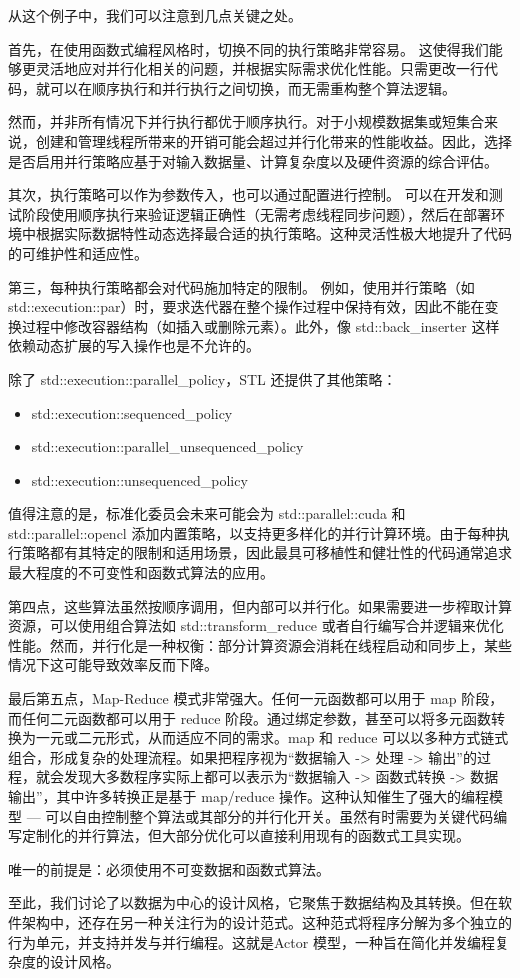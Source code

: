 从这个例子中，我们可以注意到几点关键之处。

首先，在使用函数式编程风格时，切换不同的执行策略非常容易。 这使得我们能够更灵活地应对并行化相关的问题，并根据实际需求优化性能。只需更改一行代码，就可以在顺序执行和并行执行之间切换，而无需重构整个算法逻辑。

然而，并非所有情况下并行执行都优于顺序执行。对于小规模数据集或短集合来说，创建和管理线程所带来的开销可能会超过并行化带来的性能收益。因此，选择是否启用并行策略应基于对输入数据量、计算复杂度以及硬件资源的综合评估。

其次，执行策略可以作为参数传入，也可以通过配置进行控制。 可以在开发和测试阶段使用顺序执行来验证逻辑正确性（无需考虑线程同步问题），然后在部署环境中根据实际数据特性动态选择最合适的执行策略。这种灵活性极大地提升了代码的可维护性和适应性。

第三，每种执行策略都会对代码施加特定的限制。 例如，使用并行策略（如 std::execution::par）时，要求迭代器在整个操作过程中保持有效，因此不能在变换过程中修改容器结构（如插入或删除元素）。此外，像 std::back\_inserter 这样依赖动态扩展的写入操作也是不允许的。

除了 std::execution::parallel\_policy，STL 还提供了其他策略：

\begin{itemize}
\item 
std::execution::sequenced\_policy

\item 
std::execution::parallel\_unsequenced\_policy

\item 
std::execution::unsequenced\_policy
\end{itemize}

值得注意的是，标准化委员会未来可能会为 std::parallel::cuda 和 std::parallel::opencl 添加内置策略，以支持更多样化的并行计算环境。由于每种执行策略都有其特定的限制和适用场景，因此最具可移植性和健壮性的代码通常追求最大程度的不可变性和函数式算法的应用。

第四点，这些算法虽然按顺序调用，但内部可以并行化。如果需要进一步榨取计算资源，可以使用组合算法如 std::transform\_reduce 或者自行编写合并逻辑来优化性能。然而，并行化是一种权衡：部分计算资源会消耗在线程启动和同步上，某些情况下这可能导致效率反而下降。

最后第五点，Map-Reduce 模式非常强大。任何一元函数都可以用于 map 阶段，而任何二元函数都可以用于 reduce 阶段。通过绑定参数，甚至可以将多元函数转换为一元或二元形式，从而适应不同的需求。map 和 reduce 可以以多种方式链式组合，形成复杂的处理流程。如果把程序视为“数据输入 -> 处理 -> 输出”的过程，就会发现大多数程序实际上都可以表示为“数据输入 -> 函数式转换 -> 数据输出”，其中许多转换正是基于 map/reduce 操作。这种认知催生了强大的编程模型 --- 可以自由控制整个算法或其部分的并行化开关。虽然有时需要为关键代码编写定制化的并行算法，但大部分优化可以直接利用现有的函数式工具实现。

唯一的前提是：必须使用不可变数据和函数式算法。

至此，我们讨论了以数据为中心的设计风格，它聚焦于数据结构及其转换。但在软件架构中，还存在另一种关注行为的设计范式。这种范式将程序分解为多个独立的行为单元，并支持并发与并行编程。这就是Actor 模型，一种旨在简化并发编程复杂度的设计风格。









